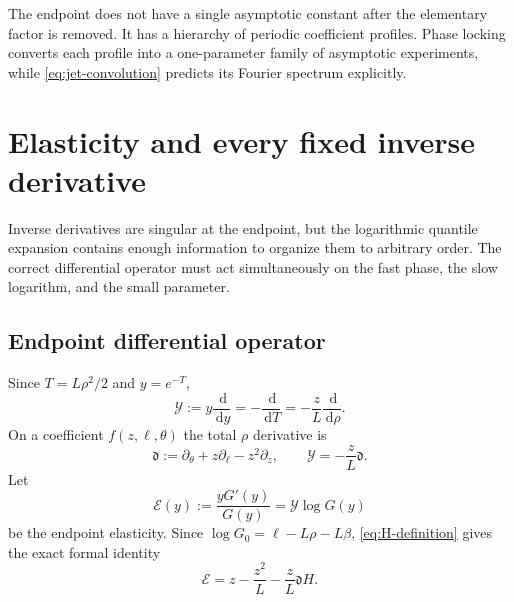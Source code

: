 \documentclass[11pt,oneside]{article}
\numberwithin{equation}{section}
\theoremstyle{definition}
\theoremstyle{remark}
\newcommand{\dd}{\,\mathrm d}
\newcommand{\Gzero}{G_0}
\begin{document}
\begin{resultbox}[Interpretation]
The endpoint does not have a single asymptotic constant after the elementary factor is removed.  It has a hierarchy of periodic coefficient profiles.  Phase locking converts each profile into a one-parameter family of asymptotic experiments, while \cref{eq:jet-convolution} predicts its Fourier spectrum explicitly.
\end{resultbox}

\section{Elasticity and every fixed inverse derivative}
\label{sec:derivatives}

Inverse derivatives are singular at the endpoint, but the logarithmic quantile expansion contains enough information to organize them to arbitrary order.  The correct differential operator must act simultaneously on the fast phase, the slow logarithm, and the small parameter.

\subsection{Endpoint differential operator}
Since $T=L\rho^2/2$ and $y=e^{-T}$,
\begin{equation}
 \mathcal Y:=y\frac{\dd}{\dd y}=-\frac{\dd}{\dd T}
 =-\frac zL\frac{\dd}{\dd\rho}.
 \label{eq:Y-def}
\end{equation}
On a coefficient $f(z,\ell,\theta)$ the total $\rho$ derivative is
\begin{equation}
 \mathfrak d:=\partial_\theta+z\partial_\ell-z^2\partial_z,
 \qquad
 \mathcal Y=-\frac zL\mathfrak d.
 \label{eq:dfrak}
\end{equation}
Let
\begin{equation}
 \mathcal E(y):=\frac{yG'(y)}{G(y)}=\mathcal Y\log G(y)
 \label{eq:elasticity-def}
\end{equation}
be the endpoint elasticity.  Since
$\log\Gzero=\ell-L\rho-L\beta$, \cref{eq:H-definition} gives the exact formal identity
\begin{equation}
 \boxed{
 \mathcal E=z-\frac{z^2}{L}-\frac zL\mathfrak dH.}
 \label{eq:elasticity-master}
\end{equation}
\end{document}

